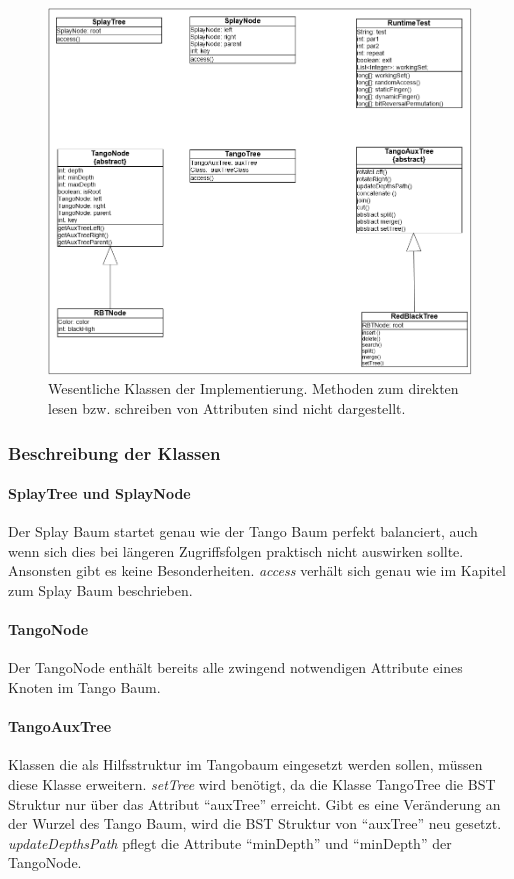 \documentclass[a4paper,12pt]{article}
\begin{document}
\begin{figure}[H]
\centering
\includegraphics[width=1\textwidth]{"Medien/laufzeittest/klassen"}
\caption{Wesentliche Klassen der Implementierung. Methoden zum direkten lesen bzw. schreiben von Attributen sind nicht dargestellt. }
\label{fig:klassen}
\end{figure}
   
\subsubsection{Beschreibung der Klassen }

\paragraph{SplayTree und SplayNode}
Der Splay Baum startet genau wie der Tango Baum perfekt balanciert, auch wenn sich dies bei längeren Zugriffsfolgen praktisch nicht auswirken sollte. Ansonsten gibt es keine Besonderheiten. \textit{access} verhält sich genau wie im Kapitel zum Splay Baum beschrieben. 

\paragraph{TangoNode}
Der TangoNode enthält bereits alle zwingend notwendigen Attribute eines Knoten im Tango Baum. 

\paragraph{TangoAuxTree}
Klassen die als Hilfsstruktur im Tangobaum eingesetzt werden sollen, müssen diese Klasse erweitern. \textit{setTree} wird benötigt, da die Klasse TangoTree die BST Struktur nur über das Attribut \enquote{auxTree} erreicht. Gibt es eine Veränderung an der Wurzel des Tango Baum, wird die BST Struktur von \enquote{auxTree} neu gesetzt. \textit{updateDepthsPath} pflegt die Attribute \enquote{minDepth} und \enquote{minDepth} der TangoNode.
\end{document}
